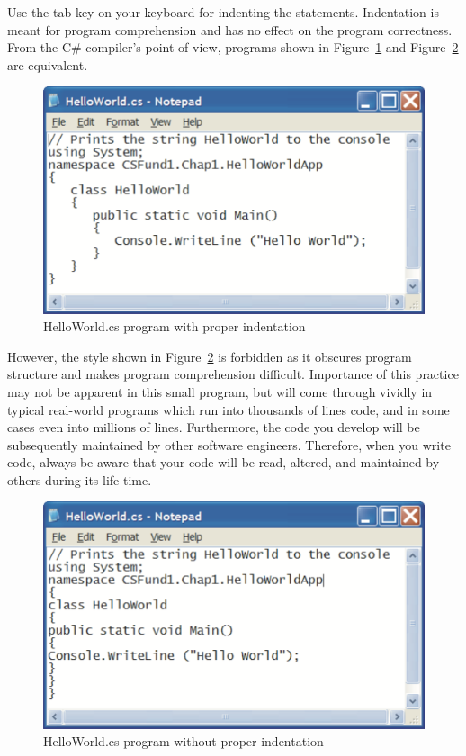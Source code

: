 Use the tab key on your keyboard for indenting the statements.
Indentation is meant for program comprehension and has no effect
on the program correctness. From the C\# compiler's point of view,
programs shown in Figure~\ref{fig:HelloWrldProg01} and
Figure~\ref{fig:HelloWrldProg02} are equivalent.

\begin{figure}
\centering
\includegraphics[scale=0.50]{./CSharpBasics/Illus/HelloWorldCS01}
\caption{HelloWorld.cs program with proper indentation}
\label{fig:HelloWrldProg01}
\end{figure}

However, the style shown in Figure~\ref{fig:HelloWrldProg02} is
forbidden as it obscures program structure and makes program
comprehension difficult. Importance of this practice may not be
apparent in this small program, but will come through vividly in
typical real-world programs which run into thousands of lines
code, and in some cases even into millions of lines. Furthermore,
the code you develop will be subsequently maintained by other
software engineers. Therefore, when you write code, always be
aware that your code will be read, altered, and maintained by
others during its life time.

\begin{figure}
\centering
\includegraphics[scale=0.50]{./CSharpBasics/Illus/HelloWorldCS02}
\caption{HelloWorld.cs program without proper indentation}
\label{fig:HelloWrldProg02}
\end{figure}


